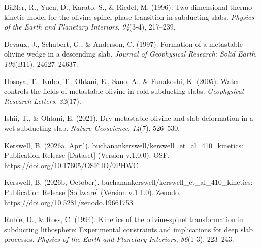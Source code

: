\documentclass[
]{article}
\newlength{\cslhangindent}
\newenvironment{CSLReferences}[2] %
 {\begin{list}{}{%
  \setlength{\itemindent}{0pt}
  \setlength{\leftmargin}{0pt}
  \setlength{\parsep}{0pt}
  \ifodd #1
   \setlength{\leftmargin}{\cslhangindent}
   \setlength{\itemindent}{-1\cslhangindent}
  \fi
  \setlength{\itemsep}{#2\baselineskip}}}
 {\end{list}}
\begin{document}
\protect{}\label{refs}
\begin{CSLReferences}{1}{0}
Däßler, R., Yuen, D., Karato, S., \& Riedel, M. (1996). Two-dimensional
thermo-kinetic model for the olivine-spinel phase transition in
subducting slabs. \emph{Physics of the Earth and Planetary Interiors},
\emph{94}(3-4), 217--239.

Devaux, J., Schubert, G., \& Anderson, C. (1997). Formation of a
metastable olivine wedge in a descending slab. \emph{Journal of
Geophysical Research: Solid Earth}, \emph{102}(B11), 24627--24637.

Hosoya, T., Kubo, T., Ohtani, E., Sano, A., \& Funakoshi, K. (2005).
Water controls the fields of metastable olivine in cold subducting
slabs. \emph{Geophysical Research Letters}, \emph{32}(17).

Ishii, T., \& Ohtani, E. (2021). Dry metastable olivine and slab
deformation in a wet subducting slab. \emph{Nature Geoscience},
\emph{14}(7), 526--530.

Kerswell, B. (2026a, April).
{buchanankerswell/kerswell\_et\_al\_410\_kinetics: Publication Release
{[}Dataset{]}} (Version v.1.0.0). OSF.
\url{https://doi.org/10.17605/OSF.IO/9PHWC}

Kerswell, B. (2026b, October).
{buchanankerswell/kerswell\_et\_al\_410\_kinetics: Publication Release
{[}Software{]}} (Version v.1.1.0). Zenodo.
\url{https://doi.org/10.5281/zenodo.19661753}

Rubie, D., \& Ross, C. (1994). Kinetics of the olivine-spinel
transformation in subducting lithosphere: Experimental constraints and
implications for deep slab processes. \emph{Physics of the Earth and
Planetary Interiors}, \emph{86}(1-3), 223--243.

\end{CSLReferences}
\end{document}
